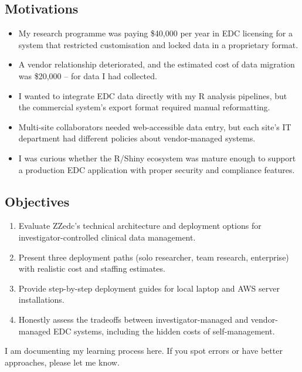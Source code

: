 \documentclass[
  letterpaper,
  DIV=11,
  numbers=noendperiod]{scrartcl}
\providecommand{\tightlist}{%
  \setlength{\itemsep}{0pt}\setlength{\parskip}{0pt}}
\begin{document}
\subsection{Motivations}\label{motivations}

\begin{itemize}
\tightlist
\item
  My research programme was paying \$40,000 per year in EDC licensing
  for a system that restricted customisation and locked data in a
  proprietary format.
\item
  A vendor relationship deteriorated, and the estimated cost of data
  migration was \$20,000 -- for data I had collected.
\item
  I wanted to integrate EDC data directly with my R analysis pipelines,
  but the commercial system's export format required manual
  reformatting.
\item
  Multi-site collaborators needed web-accessible data entry, but each
  site's IT department had different policies about vendor-managed
  systems.
\item
  I was curious whether the R/Shiny ecosystem was mature enough to
  support a production EDC application with proper security and
  compliance features.
\end{itemize}

\subsection{Objectives}\label{objectives}

\begin{enumerate}
\def\labelenumi{\arabic{enumi}.}
\tightlist
\item
  Evaluate ZZedc's technical architecture and deployment options for
  investigator-controlled clinical data management.
\item
  Present three deployment paths (solo researcher, team research,
  enterprise) with realistic cost and staffing estimates.
\item
  Provide step-by-step deployment guides for local laptop and AWS server
  installations.
\item
  Honestly assess the tradeoffs between investigator-managed and
  vendor-managed EDC systems, including the hidden costs of
  self-management.
\end{enumerate}

I am documenting my learning process here. If you spot errors or have
better approaches, please let me know.
\end{document}
